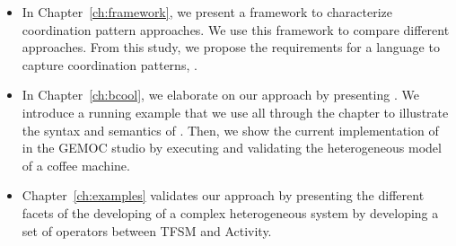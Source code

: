 \begin{itemize}
\item In Chapter~\ref{ch:framework}, we present a framework to characterize coordination pattern approaches. We use this framework to compare different approaches. From this study, we propose the requirements for a language to capture coordination patterns, \ie \bcool.  

\item In Chapter~\ref{ch:bcool}, we elaborate on our approach by presenting \bcool. We introduce a running example that we use all through the chapter to illustrate the syntax and semantics of \bcool. Then, we show the current implementation of \bcool in the GEMOC studio by executing and validating the heterogeneous model of a coffee machine. 

\item Chapter~\ref{ch:examples} validates our approach by presenting the different facets of the developing of a complex heterogeneous system by developing a set of operators between TFSM and Activity. 

	
	
\end{itemize}







